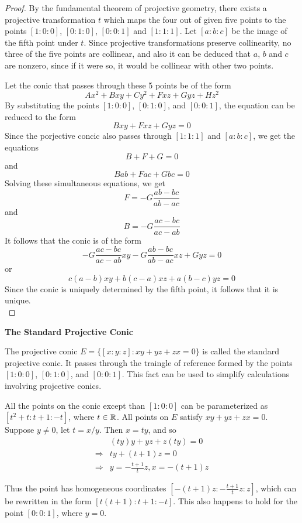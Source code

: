 \begin{proof}
 By the fundamental theorem of projective geometry, there exists a projective transformation
 $t$ which maps the four out of given five points to the points $[1:0:0]$, $[0:1:0]$, $[0:0:1]$
 and $[1:1:1]$. Let $[a:b:c]$ be the image of the fifth point under $t$. Since projective
 transformations preserve collinearity, no three of the five points are collinear, and also
 it can be deduced that $a$, $b$ and $c$ are nonzero, since if it were so, it would be collinear
 with other two points.

 Let the conic that passes through these 5 points be of the form
 \[
   Ax^2+Bxy+Cy^2+Fxz+Gyz+Hz^2
 \]
 By substituting the points $[1:0:0]$, $[0:1:0]$, and $[0:0:1]$, the equation can be reduced
 to the form
 \[
   Bxy+Fxz+Gyz=0
 \]
 Since the porjective concic also passes through $[1:1:1]$ and $[a:b:c]$, we get the equations
 \[
   B+F+G=0
 \]
 and
 \[
   Bab+Fac+Gbc=0
 \]
 Solving these simultaneous equations, we get
 \[
   F=-G\frac{ab-bc}{ab-ac}
 \]
 and
 \[
   B= -G\frac{ac-bc}{ac-ab}
 \]
 It follows that the conic is of the form
 \[
   -G\frac{ac-bc}{ac-ab}xy-G\frac{ab-bc}{ab-ac}xz+Gyz=0
 \]
 or
 \[
   c(a-b)xy+b(c-a)xz+a(b-c)yz=0
 \]
 Since the conic is uniquely determined by the fifth point, it follows that it is unique.\\
\end{proof}

\begin{remark}
  \textbf{The Standard Projective Conic}

  The projective conic $E=\{[x:y:z]:xy+yz+zx=0\}$ is called the standard projective conic.
  It passes through the traingle of reference formed by the points $[1:0:0]$, $[0:1:0]$, and
  $[0:0:1]$. This fact can be used to simplify calculations involving projcetive conics.

  All the points on the conic except than $[1:0:0]$ can be parameterized as $[t^2+t:t+1:-t]$,
  where $t\in\mathbb{R}$. All points on $E$ satisfy $xy+yz+zx=0$. Suppose $y\ne 0$, let $t=x/y$. Then
  $x=ty$, and so
  \begin{eqnarray*}
    & (ty)y+yz+z(ty)=0 \\
    \Longrightarrow & ty+(t+1)z=0 \\
    \Longrightarrow & y=-\frac{t+1}{t}z, x=-(t+1)z
  \end{eqnarray*}

  Thus the point has homogeneous coordinates $\left[-(t+1)z:-\frac{t+1}{t}z:z\right]$, which can
  be rewritten in the form $[t(t+1):t+1:-t]$. This also happens to hold for the point $[0:0:1]$,
  where $y=0$.
\end{remark}

